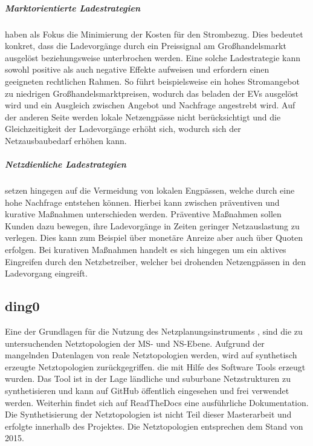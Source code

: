 \subparagraph{Marktorientierte Ladestrategien} haben als Fokus die Minimierung der Kosten für den Strombezug. Dies bedeutet konkret, dass die Ladevorgänge durch ein Preissignal am Großhandelsmarkt ausgelöst beziehungsweise unterbrochen werden. Eine solche Ladestrategie kann sowohl positive als auch negative Effekte aufweisen und erfordern einen geeigneten rechtlichen Rahmen. So führt beispielsweise ein hohes Stromangebot zu niedrigen Großhandelsmarktpreisen, wodurch das beladen der \glspl{EV} ausgelöst wird und ein Ausgleich zwischen Angebot und Nachfrage angestrebt wird. Auf der anderen Seite werden lokale Netzengpässe nicht berücksichtigt und die Gleichzeitigkeit der Ladevorgänge erhöht sich, wodurch sich der Netzausbaubedarf erhöhen kann. \cite{Agora2019} \cite{Dorendorf2019}



\subparagraph{Netzdienliche Ladestrategien} setzen hingegen auf die Vermeidung von lokalen Engpässen, welche durch eine hohe Nachfrage entstehen können. Hierbei kann zwischen präventiven und kurative Maßnahmen unterschieden werden. Präventive Maßnahmen sollen Kunden dazu bewegen, ihre Ladevorgänge in Zeiten geringer Netzauslastung zu verlegen. Dies kann zum Beispiel über monetäre Anreize aber auch über Quoten erfolgen. Bei kurativen Maßnahmen handelt es sich hingegen um ein aktives Eingreifen durch den Netzbetreiber, welcher bei drohenden Netzengpässen in den Ladevorgang eingreift. \cite{Agora2019}


\subsection{ding0}\label{chap:dingo_theo}

Eine der Grundlagen für die Nutzung des Netzplanungsinstruments \edisgodot, sind die zu untersuchenden Netztopologien der \gls{MS}- und \gls{NS}-Ebene.
Aufgrund der mangelnden Datenlagen von reale Netztopologien werden, wird auf synthetisch erzeugte Netztopologien zurückgegriffen.
die mit Hilfe des Software Tools \dingo erzeugt wurden.
Das Tool ist in der Lage ländliche und suburbane Netzstrukturen zu synthetisieren und kann auf GitHub \cite{dingo2019} öffentlich eingesehen und frei verwendet werden.
Weiterhin findet sich auf ReadTheDocs \cite{dingo-docs2019} eine ausführliche Dokumentation.
Die Synthetisierung der Netztopologien ist nicht Teil dieser Masterarbeit und erfolgte innerhalb des \openego Projektes. \cite{Mueller2019} Die Netztopologien entsprechen dem Stand von \num{2015}.


